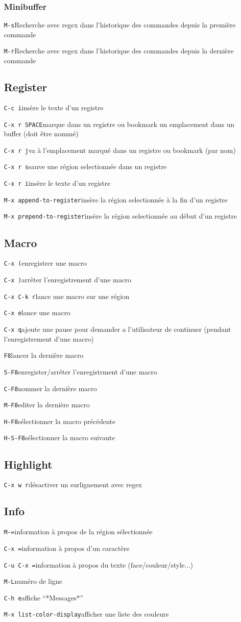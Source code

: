 \documentclass[10pt,landscape]{article}
\def\cm#1#2{{\tt#1}\dotfill#2\par}
\begin{document}
\begin{multicols}{3}
\subsubsection{Minibuffer}
\cm{M-s}{Recherche avec regex dans l'historique des commandes depuis la première commande}
\cm{M-r}{Recherche avec regex dans l'historique des commandes depuis la dernière commande}





\subsection{Register}
\cm{C-c i}{insère le texte d'un registre}
\cm{C-x r SPACE}{marque dans un registre ou bookmark un emplacement dans un buffer (doit être nommé)}
\cm{C-x r j}{va à l'emplacement marqué dans un registre ou bookmark (par nom)}
\cm{C-x r s}{sauve une région selectionnée dans un registre}
\cm{C-x r i}{insère le texte d'un registre}
\cm{M-x append-to-register}{insère la région selectionnée à la fin d'un registre}
\cm{M-x prepend-to-register}{insère la région selectionnée au début d'un registre}





\subsection{Macro}
\cm{C-x (}{enregistrer une macro}
\cm{C-x )}{arrêter l'enregistrement d'une macro}
\cm{C-x C-k r}{lance une macro sur une région}
\cm{C-x e}{lance une macro}
\cm{C-x q}{ajoute une pause pour demander a l'utilisateur de continuer (pendant l'enregistrement d'une macro)}
\cm{F8}{lancer la dernière macro}
\cm{S-F8}{enregister/arrêter l'enregistrment d'une macro}
\cm{C-F8}{nommer la dernière macro}
\cm{M-F8}{editer la dernière macro}
\cm{H-F8}{sélectionner la macro précédente}
\cm{H-S-F8}{sélectionner la macro suivante}





\subsection{Highlight}
\cm{C-x w r}{désactiver un surlignement avec regex}





\subsection{Info}
\cm{M-=}{information à propos de la région sélectionnée}
\cm{C-x =}{information à propos d'un caractère}
\cm{C-u C-x =}{information à propos du texte (face/couleur/style...)}
\cm{M-L}{numéro de ligne}
\cm{C-h e}{affiche ``*Messages*''}
\cm{M-x list-color-display}{afficher une liste des couleurs}


\end{multicols}
\end{document}
